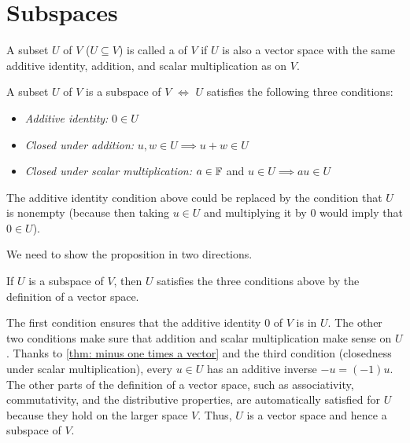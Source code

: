 \section{Subspaces}

\begin{mydef} [subspace]
  A subset $U$ of $V$ ($U \subseteq V$) is called a  of $V$ if $U$ is also a vector space with the same additive identity, addition, and scalar multiplication as on $V$.
\end{mydef}

\begin{thm} 
  \label{thm: conditions for a subspace}
  A subset $U$ of $V$ is a subspace of $V$ $\iff$ $U$ satisfies the following three conditions:
  \begin{itemize}
    \item \emph{Additive identity:}
    $0 \in U$
    \item \emph{Closed under addition:}
    $u,w \in U \implies u+w \in U$
    \item \emph{Closed under scalar multiplication:}
    $a \in \mathbb{F}$ and $u \in U \implies au \in U$
  \end{itemize}
  The additive identity condition above could be replaced by the condition that $U$ is nonempty (because then taking $u \in U$ and multiplying it by $0$ would imply that $0\in U$).
\end{thm}
\begin{prf} We need to show the proposition in two directions.
  \begin{description}
    \item{\Rightarrowdirection} If $U$ is a subspace of $V$, then $U$ satisfies the three conditions above by the definition of a vector space.
    \item{\Leftarrowdirection} The first condition ensures that the additive identity $0$ of $V$ is in $U$. The other two conditions make sure that addition and scalar multiplication make sense on $U$.
    Thanks to \ref{thm: minus one times a vector} and the third condition (closedness under scalar multiplication), every $u \in U$ has an additive inverse $-u = (-1) u$.
    The other parts of the definition of a vector space, such as associativity, commutativity, and the distributive properties, are automatically satisfied for $U$ because they hold on the larger space $V$. Thus, $U$ is a vector space and hence a subspace of $V$.
  \end{description}
  \vspace*{-\baselineskip}
\end{prf}

